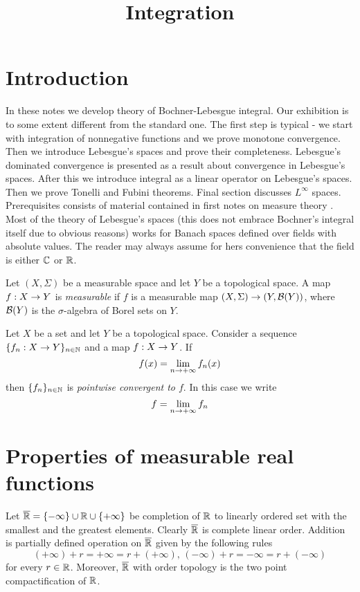 



\title{Integration}
\date{}
\maketitle

\section{Introduction}
In these notes we develop theory of Bochner-Lebesgue integral. Our exhibition is to some extent different from the standard one. The first step is typical - we start with integration of nonnegative functions and we prove monotone convergence. Then we introduce Lebesgue's spaces and prove their completeness. Lebesgue's dominated convergence is presented as a result about convergence in Lebesgue's spaces. After this we introduce integral as a linear operator on Lebesgue's spaces. Then we prove Tonelli and Fubini theorems. Final section discusses $L^{\infty}$ spaces.\\
Prerequisites consists of material contained in first notes on measure theory \cite{Introduction_to_measure_theory}. Most of the theory of Lebesgue's spaces (this does not embrace Bochner's integral itself due to obvious reasons) works for Banach spaces defined over fields with absolute values. The reader may always assume for hers convenience that the field is either ${\mathbb C}$ or ${\mathbb R}$.

\begin{definition}
Let $(X,\Sigma)$ be a measurable space and let $Y$ be a topological space. A map $f:X\rightarrow Y$ is \textit{measurable} if $f$ is a measurable map $(X,\Sigma)\rightarrow (Y,{\mathcal B}(Y))$, where ${\mathcal B}(Y)$ is the $\sigma$-algebra of Borel sets on $Y$. 
\end{definition}

\begin{definition}
Let $X$ be a set and let $Y$ be a topological space. Consider a sequence $\{f_n:X\rightarrow Y\}_{n\in {\mathbb N}}$ and a map $f:X\rightarrow Y$. If 
$$f(x) = \lim_{n\rightarrow +\infty}f_n(x)$$
then $\{f_n\}_{n\in {\mathbb N}}$ is \textit{pointwise convergent to $f$}. In this case we write
$$f = \lim_{n\rightarrow +\infty}f_n$$
\end{definition}

\section{Properties of measurable real functions}
\noindent
Let $\overline{{\mathbb R}}=\{-\infty\} \cup {\mathbb R} \cup \{+\infty\}$ be completion of ${\mathbb R}$ to linearly ordered set with the smallest and the greatest elements. Clearly $\overline{{\mathbb R}}$ is complete linear order. Addition is partially defined operation on $\overline{{\mathbb R}}$ given by the following rules
$$(+\infty)+r=+\infty=r+(+\infty),\,(-\infty)+r=-\infty=r+(-\infty)$$
for every $r\in {\mathbb R}$. Moreover, $\overline{{\mathbb R}}$ with order topology is the two point compactification of ${\mathbb R}$.

